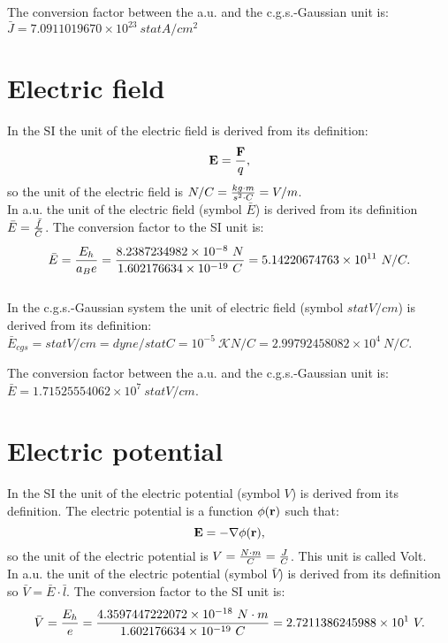 \documentclass[12pt,a4paper]{article}
\def\barf{8.2387234982\times 10^{-8}}
\def\baru{4.3597447222072\times 10^{-18}}
\def\barc{1.602176634\times 10^{-19}}
\def\bare{5.14220674763\times 10^{11}}
\def\barphi{2.7211386245988\times 10^{1}}
\def\etoe{2.99792458082\times 10^{4}}
\def\barcurcgs{7.0911019670\times 10^{23}}
\def\barecgs{1.71525554062\times 10^{7}}
\begin{document}
{\color{green} 
The conversion factor between the a.u. and the c.g.s.-Gaussian unit
is: $\bar J = \barcurcgs\ statA/cm^2 $
\\

}

\newpage
\section{\color{coral}Electric field}
In the SI the unit of the electric field is derived from 
its definition:
\begin{equation}
{\bf E}={{\bf F} \over q},
\end{equation}
so the unit of the electric field is $N/C= {kg\cdot m \over s^2 \cdot C}
=V/m$.
\\

{\color{web-blue} In a.u. the unit of the electric field (symbol $\bar E$) 
is derived from its definition $\bar E={\bar f \over \bar C}$. The 
conversion factor to the SI unit is:
\begin{equation}
\bar E= {E_h\over a_B e}= {\barf\ N \over \barc\ C}= \bare\ N/C. 
\end{equation}
}
\\

{\color{orange} In the c.g.s.-Gaussian system the unit of electric field
(symbol $statV/cm$) is derived from its definition:
$\bar E_{cgs}=statV/cm=dyne / statC = {10^{-5}\ \mathcal{K} } N/C=\etoe\ N/C$. 
\\
}

{\color{green} 
The conversion factor between the a.u. and the c.g.s.-Gaussian unit
is: $\bar E = \barecgs \ statV/cm$.
}

\newpage
\section{\color{coral}Electric potential}
In the SI the unit of the electric potential (symbol $V$)
is derived from its definition. The electric 
potential is a function $\phi({\bf r})$ such that:
\begin{equation}
{\bf E}=- \nabla \phi({\bf r}),
\end{equation}
so the unit of the electric potential is $V={N \cdot m \over C}={J\over C}$. 
This unit is called Volt.
\\

{\color{web-blue} In a.u. the unit of the electric potential 
(symbol $\bar V$) 
is derived from its definition so $\bar V={\bar E \cdot \bar l}$. 
The conversion factor to the SI unit is:
\begin{equation}
\bar V= {E_h\over e}=
{\baru\ N\cdot m\over \barc\ C} =\barphi\ V.
\end{equation}
}
\\
\end{document}
